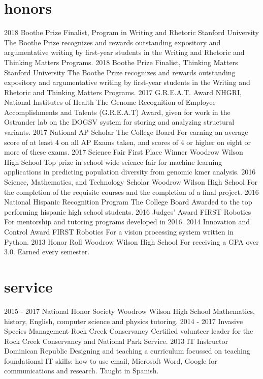 \documentclass[]{cv}
\begin{document}
\section{honors}
\begin{entrylist}
	\entry
    {2018}
    {Boothe Prize Finalist, Program in Writing and Rhetoric}
    {Stanford University}
    {The Boothe Prize recognizes and rewards outstanding expository and argumentative writing by first-year students in the Writing and Rhetoric and Thinking Matters Programs.}
    \entry
    {2018}
    {Boothe Prize Finalist, Thinking Matters}
    {Stanford University}
    {The Boothe Prize recognizes and rewards outstanding expository and argumentative writing by first-year students in the Writing and Rhetoric and Thinking Matters Programs.}
    \entry
    {2017}
    {G.R.E.A.T. Award}
    {NHGRI, National Institutes of Health}
    {The Genome Recognition of Employee Accomplishments and Talents (G.R.E.A.T) Award, given for work in the Ostrander lab on the DOGSV system for storing and analyzing structural variants.}
    \entry
    {2017}
    {National AP Scholar}
    {The College Board}
    {For earning an average score of at least 4 on all AP Exams taken, and scores of 4 or higher on eight or more of these exams.}
    \entry
    {2017}
    {Science Fair First Place Winner}
    {Woodrow Wilson High School}
    {Top prize in school wide science fair for machine learning applications in predicting population diversity from genomic kmer analysis.}
  \entry
    {2016}
    {Science, Mathematics, and Technology Scholar}
    {Woodrow Wilson High School}
    {For the completion of the requisite courses and the completion of a final project.}
  \entry
    {2016}
    {National Hispanic Recognition Program}
    {The College Board}
    {Awarded to the top performing hispanic high school students.}
  \entry
    {2016}
    {Judges' Award}
    {FIRST Robotics}
    {For mentorship and tutoring programs developed in 2016.}
  \entry
    {2014}
    {Innovation and Control Award}
    {FIRST Robotics}
    {For a vision processing system written in Python.}
  \entry
    {2013}
    {Honor Roll}
    {Woodrow Wilson High School}
    {For receiving a GPA over 3.0. Earned every semester.}
\end{entrylist}

\section{service}
\begin{entrylist}
  \entry
    {2015 - 2017}
    {National Honor Society}
    {Woodrow Wilson High School}
    {Mathematics, history, English, computer science and physics tutoring.}
  \entry
    {2014 - 2017}
    {Invasive Species Management}
    {Rock Creek Conservancy}
    {Certified volunteer leader for the Rock Creek Conservancy and National Park Service.}
  \entry
    {2013}
    {IT Instructor}
    {Dominican Republic}
    {Designing and teaching a curriculum focussed on teaching foundational IT skills: how to use email, Microsoft Word, Google for communications and research. Taught in Spanish.}
\end{entrylist}
\end{document}
